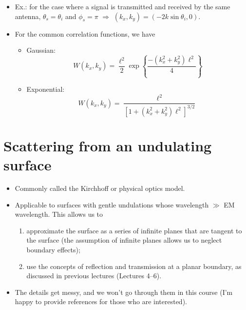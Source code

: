 \documentclass[11pt, oneside]{article}
\begin{document}
\begin{itemize}
\begin{itemize}
	\end{itemize}
	\item Ex.: for the case where a signal is transmitted and received by the same antenna, $\theta_s = \theta_i$ and $\phi_s = \pi$ $\Rightarrow$ $(k_x, k_y) = (-2k\sin\theta_i, 0)$.
	\item For the common correlation functions, we have
	\begin{itemize}
		\item Gaussian:
		\begin{equation}
			\label{e:W_g}
			\boxed{W(k_x,k_y) = \frac{\ell^2}{2}\exp\left\{\frac{-\left(k_x^2 + k_y^2\right)\ell^2}{4}\right\}}
		\end{equation}
		\item Exponential:
		\begin{equation}
			\label{e:W_e}
			W(k_x,k_y) = \frac{\ell^2}{\left[1 + \left(k_x^2 + k_y^2\right)\ell^2\right]^{3/2}}
		\end{equation}
	\end{itemize}
\end{itemize}

\section{Scattering from an undulating surface}
\label{s:undulating}

\begin{itemize}
	\item Commonly called the Kirchhoff or physical optics model.
	\item Applicable to surfaces with gentle undulations whose wavelength $\gg$ EM wavelength. This allows us to
	\begin{enumerate}
		\item approximate the surface as a series of infinite planes that are tangent to the surface (the assumption of infinite planes allows us to neglect boundary effects);
		\item use the concepts of reflection and transmission at a planar boundary, as discussed in previous lectures (Lectures 4--6).
	\end{enumerate}
	\item The details get messy, and we won't go through them in this course (I'm happy to provide references for those who are interested).
\end{itemize}
\end{document}
